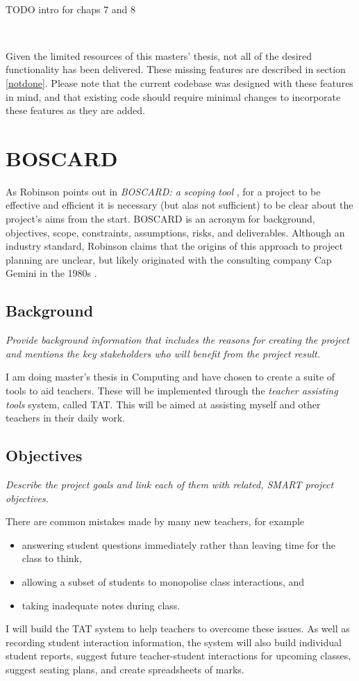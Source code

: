\documentclass[10pt]{article}
\begin{document}
\

TODO intro for chaps 7 and 8

\

Given the limited resources of this masters' thesis, not all of the desired functionality has been delivered. These missing features are described in section \ref{notdone}. Please note that the current codebase was designed with these features in mind, and that existing code should require minimal changes to incorporate these features as they are added.

\section{BOSCARD}

As Robinson points out in \emph{BOSCARD: a scoping tool} \cite{Rob19}, for a project to be effective and efficient it is necessary (but alas not sufficient) to be clear about the project's aims from the start. BOSCARD is an acronym for background, objectives, scope, constraints, assumptions, risks, and deliverables. Although an industry standard, Robinson claims that the origins of this approach to project planning are unclear, but likely originated with the consulting company Cap Gemini in the 1980s \cite[p. 181]{Rob19}.

\subsection{Background}
\emph{Provide background information that includes the reasons for creating the project and mentions the key stakeholders who will benefit from the project result.}

I am doing master's thesis in Computing and have chosen to create a suite of tools to aid teachers. These will be implemented through the \emph{teacher assisting tools} system, called TAT. This will be aimed at assisting  myself and other teachers in their daily work.

\subsection{Objectives} 
\emph{Describe the project goals and link each of them with related, SMART project objectives.}

There are common mistakes made by many new teachers, for example 
\begin{itemize}
\item answering student questions immediately rather than leaving time for the class to think,
\item allowing a subset of students to monopolise class interactions, and
\item taking inadequate notes during class.
\end{itemize}
I will build the TAT system to help teachers to overcome these issues. As well as recording student interaction information, the system will also build individual student reports, suggest future teacher-student interactions for upcoming classes, suggest seating plans, and create spreadsheets of marks.
\end{document}
